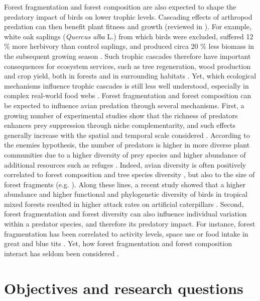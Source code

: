 \documentclass[10pt, twoside]{book} %
\begin{document}
Forest fragmentation and forest composition are also expected to shape the predatory impact of birds on lower trophic levels. Cascading effects of arthropod predation can then benefit plant fitness and growth (reviewed in \citealt{Mantyla2011}). For example, white oak saplings (\textit{Quercus alba} L.) from which birds were excluded, suffered 12 \% more herbivory than control saplings, and produced circa 20 \% less biomass in the subsequent growing season \citep{Marquis1994}. Such trophic cascades therefore have important consequences for ecosystem services, such as tree regeneration, wood production and crop yield, both in forests and in surrounding habitats \citep{Mantyla2011, Maas2016}. Yet, which ecological mechanisms influence trophic cascades is still less well understood, especially in complex real-world food webs \citep{Schmitz2000, Vidal2018}. Forest fragmentation and forest composition can be expected to influence avian predation through several mechanisms. First, a growing number of experimental studies show that the richness of predators enhances prey suppression through niche complementarity, and such effects generally increase with the spatial and temporal scale considered \citep{Duffy2002, Casula2006, Griffin2013}. According to the enemies hypothesis, the number of predators is higher in more diverse plant communities due to a higher diversity of prey species and higher abundance of additional resources such as refuges \citep{Letourneau1987, Root1973, Russell1989}. Indeed, avian diversity is often positively correlated to forest composition and tree species diversity \citep{Giffard2012, Charbonnier2016}, but also to the size of forest fragments (e.g. \citealt{Andren1994}). Along these lines, a recent study showed that a higher abundance and higher functional and phylogenetic diversity of birds in tropical mixed forests resulted in higher attack rates on artificial caterpillars \citep{Nell2018}. Second, forest fragmentation and forest diversity can also influence individual variation within a predator species, and therefore its predatory impact. For instance, forest fragmentation has been correlated to activity levels, space use or food intake in great and blue tits \citep{Naef-Daenzer2000, Bueno-Enciso2016}. Yet, how forest fragmentation and forest composition interact has seldom been considered \citep{Vidal2018}.\\

\clearpage
	\section{Objectives and research questions}
	
\end{document}
